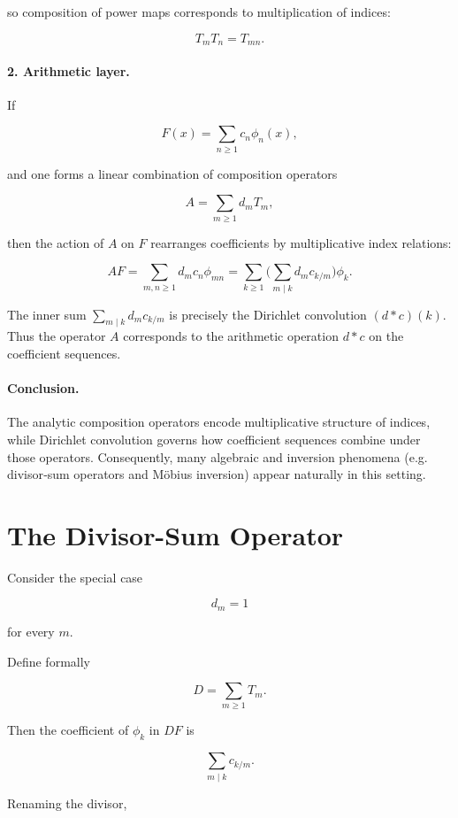 so composition of power maps corresponds to multiplication of indices:


\[
T_mT_n=T_{mn}.
\]



\paragraph{2. Arithmetic layer.}
If


\[
F(x)=\sum_{n\ge1} c_n\phi_n(x),
\]


and one forms a linear combination of composition operators


\[
A=\sum_{m\ge1} d_m T_m,
\]


then the action of \(A\) on \(F\) rearranges coefficients by multiplicative index relations:


\[
AF=\sum_{m,n\ge1} d_m c_n \phi_{mn}
=\sum_{k\ge1}\Big(\sum_{m\mid k} d_m c_{k/m}\Big)\phi_k.
\]


The inner sum \(\sum_{m\mid k} d_m c_{k/m}\) is precisely the Dirichlet convolution
\((d*c)(k)\). Thus the operator \(A\) corresponds to the arithmetic operation \(d*c\)
on the coefficient sequences.

\paragraph{Conclusion.}
The analytic composition operators encode multiplicative structure of indices,
while Dirichlet convolution governs how coefficient sequences combine under those operators.
Consequently, many algebraic and inversion phenomena (e.g. divisor‑sum operators and Möbius inversion)
appear naturally in this setting.


\section{The Divisor-Sum Operator}

Consider the special case

\[
d_m=1
\]

for every \(m\).

Define formally

\[
D
=
\sum_{m\geq1}T_m.
\]

Then the coefficient of \(\phi_k\) in \(DF\) is

\[
\sum_{m\mid k}c_{k/m}.
\]

Renaming the divisor,

